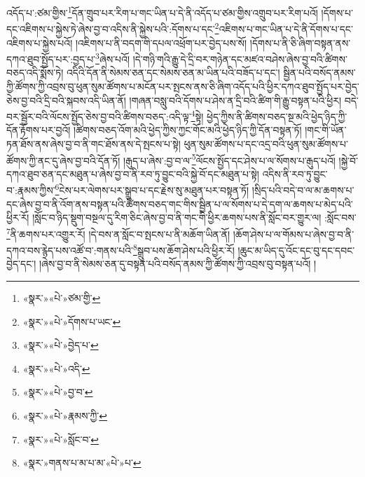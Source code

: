 འདོད་པ་:ཙམ་གྱིས་\footnote{«སྣར་»«པེ་»ཙམ་གྱི་}དོན་གྲུབ་པར་རིག་པ་གང་ཡིན་པ་དེ་ནི་འདོད་པ་ཙམ་གྱིས་འགྲུབ་པར་རིག་པའོ། །དོགས་པ་དང་འཇིགས་པ་སྐྱེས་ཏེ་ཞེས་བྱ་བ་འདིས་ནི་སྐྱེས་པའི་:དོགས་པ་དང་\footnote{«སྣར་»«པེ་»དོགས་པ་ཡང་}འཇིགས་པ་གང་ཡིན་པ་དེ་ནི་དོགས་པ་དང་འཇིགས་པ་སྐྱེས་པའོ། །འཇིགས་པ་ནི་བདག་གི་དཔལ་འཕྲོག་པར་བྱེད་པས་སོ། །དོགས་པ་ནི་ཅི་ཞིག་བསྟན་ནས་དཀའ་ཐུབ་སྤྱོད་པར་:བྱད་པ་\footnote{«སྣར་»«པེ་»བྱེད་པ་}ཞེས་པའོ། །དེ་གཉི་གའི་རྒྱུ་དེ་དྲི་བར་གཉེན་དང་མཛའ་བཤེས་ཞེས་བྱ་བའི་ཚིགས་བཅད་འདི་སྨོས་ཏེ། འདིའི་དོན་ནི་སེམས་ཅན་དང་སེམས་ཅན་མ་ཡིན་པའི་བཟོད་པ་དང་། སྦྱིན་པའི་བསོད་ནམས་ཀྱི་ཚོགས་ཀྱི་འབྲས་བུ་ཕུན་སུམ་ཚོགས་པ་མངོན་པར་སྤངས་ནས་ཅི་ཞིག་འདོད་པའི་ཕྱིར་དཀའ་ཐུབ་སྤྱོད་པར་བྱེད་ཅེས་བྱ་བའི་དྲི་བའི་སྐབས་འདི་ཡིན་ནོ། །གཞན་བསླུ་བའི་དོགས་པ་ཤེས་ན་དྲི་བའི་ཚིག་གི་རྒྱུ་བསྟན་པའི་ཕྱིར། བདེ་བར་སྦྱོར་བའི་ལོངས་སྤྱོད་ཅེས་བྱ་བའི་ཚིགས་བཅད་:འདི་ལྟ་\footnote{«སྣར་»«པེ་»འདི་}སྟེ། ཕྱེད་ཀྱིས་ནི་ཚིགས་བཅད་སྔ་མའི་ཕྱེད་ཉིད་ཀྱི་དོན་རྟོགས་པར་བྱའོ། །ཚིགས་བཅད་འོག་མའི་ཕྱེད་ཀྱིས་ཀྱང་གོང་མའི་ཕྱེད་ཉིད་ཀྱི་དོན་བསྟན་ཏོ། །གང་གི་ཡོན་ཏན་ཐོས་ནས་ཞེས་བྱ་བ་ནི་གང་ཐོས་ནས་དེ་སྤངས་པ་སྟེ། ཕུན་སུམ་ཚོགས་པ་དང་འདྲ་བའི་ཕུན་སུམ་ཚོགས་པ་ཚོགས་ཀྱི་ནང་དུ་ཞེས་བྱ་བའི་དོན་ཏོ། །རྒུད་པ་ཞེས་:བྱ་བ་ལ་\footnote{«སྣར་»«པེ་»བྱ་བ་}ལོངས་སྤྱོད་དང་ཤེས་པ་ལ་སོགས་པ་རྒུད་པའོ། །སྐྱེ་བོ་དཀའ་ཐུབ་ཅན་དང་མཐུན་པ་ཞེས་བྱ་བ་ནི་རབ་ཏུ་བྱུང་བའི་སྐྱེ་བོ་དང་མཐུན་པ་སྟེ། འདིས་ནི་རབ་ཏུ་བྱུང་བ་:རྣམས་ཀྱིས་\footnote{«སྣར་»«པེ་»རྣམས་ཀྱི་}ངེས་པར་ལེགས་པར་སྒྲུབ་པ་དང་རྗེས་སུ་མཐུན་པར་བསྟན་ཏོ། །སྲིད་པའི་བདེ་བ་ལ་མ་ཆགས་པ་དང་ཞེས་བྱ་བ་ནི་འོག་ནས་བསྟན་པའི་ཚིགས་བཅད་གང་གིས་སྦྱིན་པ་ལ་སོགས་པ་དེ་དག་ལ་ཆགས་པ་མེད་པའི་ཕྱིར་རོ། །སློང་བ་ཉིད་སྡུག་བསྔལ་དུ་རིག་ཅིང་ཞེས་བྱ་བ་ནི་གང་གི་ཕྱིར་ཆགས་པས་ནི་སློང་བར་གྱུར་ལ། :སློང་བས་\footnote{«སྣར་»«པེ་»སློང་བ་}ནི་ཆགས་པར་འགྱུར་རོ། །དེ་བས་ན་སློང་བ་སྤངས་པ་ནི་མཆོག་ཡིན་ནོ། །ཆོག་ཤེས་པ་ལ་གོམས་པ་ཞེས་བྱ་བ་ནི་དཀའ་བས་རྙེད་པས་འཚོ་བ་:གནས་པའི་\footnote{«སྣར་»གནས་པ་མ་པ་མ་«པེ་»པ་}སྒྲུབ་པས་ཆོག་ཤེས་པའི་ཕྱིར་རོ། །ཆུང་མ་ཡིད་དུ་འོང་དང་བུ་དང་དབང་བྱེད་དང་། །ཞེས་བྱ་བ་ནི་སེམས་ཅན་དུ་བསྟན་པའི་བསོད་ནམས་ཀྱི་ཚོགས་ཀྱི་འབྲས་བུ་བསྟན་པའོ། །

